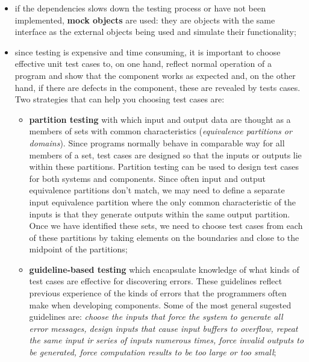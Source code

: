 \documentclass[oneside]{article}
\begin{document}
\begin{itemize}
\begin{itemize}
        \item if the dependencies slows down  the testing process or have not been implemented, \textbf{mock objects} are used: they are  objects with the same interface as the external objects being used and simulate their functionality;
        
        \item since testing is expensive and time consuming, it is important to choose effective unit test cases to, on one hand, reflect normal operation of a program and show that the component works as expected and, on the other hand, if there are defects in the component, these are revealed by tests cases. Two strategies that can help you choosing test cases are:
            \begin{itemize}
                \item \textbf{partition testing} with which input and output data are thought as a members of sets with common characteristics (\textit{equivalence partitions or domains}). Since programs normally behave in comparable way for all members of a set, test cases are designed so that the inputs or outputs lie within these partitions. Partition testing can be used to design test cases for both systems and components. Since often input and output equivalence partitions don't match, we may need to define a separate input equivalence partition where the only common characteristic of the inputs is that they generate outputs within the same output partition. Once we have identified these sets, we need to choose test cases from each of these partitions by taking elements on the boundaries and close to the midpoint of the partitions;
                
                \item \textbf{guideline-based testing} which encapsulate knowledge of what kinds of test cases are effective for discovering errors. These guidelines reflect previous experience of the kinds of errors that the programmers often make when developing components. Some of the most general sugested guidelines are: \textit{choose the inputs that force the system to generate all error messages, design inputs that cause input buffers to overflow, repeat the same input ir series of inputs numerous times, force invalid outputs to be generated, force computation results to be too large or too small};
            \end{itemize}
            

\end{itemize}
\end{itemize}
\end{document}
